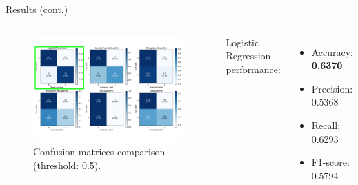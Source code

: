 \documentclass[aspectratio=169,xcolor=dvipsnames]{beamer}
\begin{document}


\begin{frame}{Results (cont.)}

    \begin{columns}[c]

        \begin{figure}[htpb]
            \centering
            \includegraphics[width=\textwidth]{confusion_matrices_annot_green}
            \caption{Confusion matrices comparison (threshold: 0.5).}
        \end{figure}
        
    
        Logistic Regression performance:
        \begin{itemize}
            \item Accuracy: \textbf{0.6370}
            \item Precision: 0.5368
            \item Recall: 0.6293
            \item F1-score: 0.5794
        \end{itemize}
        



\end{columns}
\end{frame}
\end{document}
